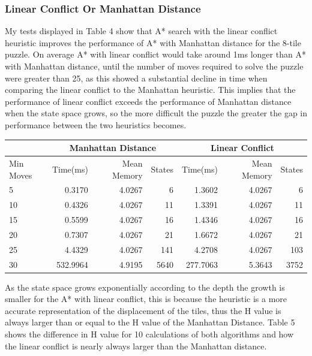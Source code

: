 \documentclass[final]{cmpreport}
\begin{document}
\subsubsection{Linear Conflict Or Manhattan Distance}
My tests displayed in Table 4 show that A* search with the linear conflict heuristic improves the performance of A* with Manhattan distance for the 8-tile puzzle. On average A* with linear conflict would take around 1ms longer than A* with Manhattan distance, until the number of moves required to solve the puzzle were greater than 25, as this showed a substantial decline in time when comparing the linear conflict to the Manhattan heuristic. This implies that the performance of linear conflict exceeds the performance of Manhattan distance when the state space grows, so the more difficult the puzzle the greater the gap in performance between the two heuristics becomes.
\begin{center}
	\begin{tabular}{|l|r|r|r|r|r|r|} \cline{2-7}
		
		\multicolumn{1}{c}{} & \multicolumn{3}{|c|}{Manhattan Distance} &
		\multicolumn{3}{|c|}{Linear Conflict} \\ \hline
		Min Moves & Time(ms) & Mean Memory & States & Time(ms) & Mean Memory & States \\	\hline \hline
		5 & 0.3170 & 4.0267 & 6               & 1.3602 & 4.0267 & 6 \\
		10 & 0.4326 & 4.0267 & 11             & 1.3391 & 4.0267 & 11 \\
		15 & 0.5599 & 4.0267 & 16             & 1.4346 & 4.0267 & 16 \\
		20 & 0.7307 & 4.0267 & 21             & 1.6672 & 4.0267 & 21 \\
		25 & 4.4329 & 4.0267 & 141            & 4.2708 & 4.0267 & 103\\
		30 & 532.9964 & 4.9195 & 5640         & 277.7063& 5.3643 &3752\\
		\hline
	
	\end{tabular}

\end{center}
 As the state space grows exponentially according to the depth the growth is smaller for the A* with linear conflict, this is because the heuristic is a more accurate representation of the displacement of the tiles, thus the H value is always larger than or equal to the H value of the Manhattan Distance. Table 5 shows the difference in H value for 10 calculations of both algorithms and how the linear conflict is nearly always larger than the Manhattan distance.
 
\end{document}

